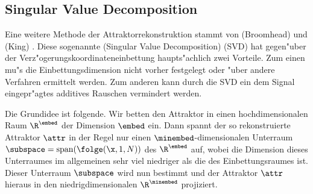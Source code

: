 \subsection{Singular Value Decomposition}
\label{chapsvd}
Eine weitere Methode der Attraktorrekonstruktion stammt von \autor(Broomhead) und
\autor(King) \cite{Broomhead-king}. Diese sogenannte \begriff(Singular Value
Decomposition) (SVD) hat gegen"uber der Verz"ogerungskoordinateneinbettung haupts"achlich
zwei Vorteile. Zum einen mu"s die Einbettungsdimension nicht vorher festgelegt oder "uber
andere Verfahren ermittelt werden. Zum anderen kann durch die SVD ein dem Signal
eingepr"agtes additives Rauschen vermindert werden.

Die Grundidee ist folgende. Wir betten den Attraktor in einen hochdimensionalen Raum
$\R^\embed$ der Dimension $\embed$ ein. Dann spannt der so rekonstruierte Attraktor
$\attr$ in der Regel nur einen $\minembed$-dimensio\-nalen Unterraum
$\subspace=\mathop{\mathrm{span}}(\folge(\x,1,N))$  des
$\R^\embed$ auf, wobei die Dimension dieses Unterraumes im allgemeinen sehr viel niedriger
als die des Einbettungsraumes ist.  Dieser Unterraum $\subspace$ wird nun bestimmt und der
Attraktor $\attr$ hieraus in den niedrigdimensionalen $\R^\minembed$ projiziert.

